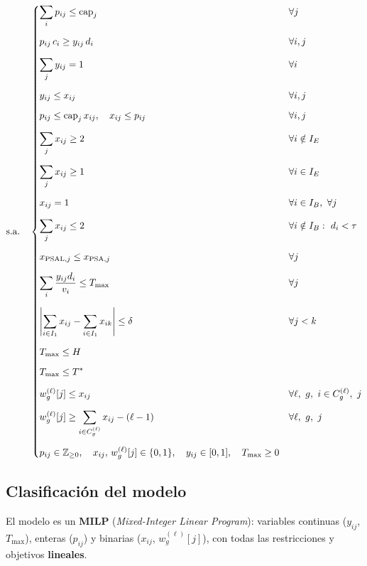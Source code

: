 \documentclass[12pt, a4paper]{article}
\begin{document}
\[
\text{s.a.} \quad
\begin{dcases}
\displaystyle\sum_{i} p_{ij} \leq \text{cap}_j & \forall j \\[6pt]
p_{ij}\, c_i \geq y_{ij}\, d_i & \forall i,j \\[6pt]
\displaystyle\sum_{j} y_{ij} = 1 & \forall i \\[6pt]
y_{ij} \leq x_{ij} & \forall i,j \\[6pt]
p_{ij} \leq \text{cap}_j\, x_{ij},\quad x_{ij} \leq p_{ij} & \forall i,j \\[6pt]
\displaystyle\sum_{j} x_{ij} \geq 2 & \forall i \notin I_E \\[6pt]
\displaystyle\sum_{j} x_{ij} \geq 1 & \forall i \in I_E \\[6pt]
x_{ij} = 1 & \forall i \in I_B,\ \forall j \\[6pt]
\displaystyle\sum_{j} x_{ij} \leq 2 & \forall i \notin I_B :\ d_i < \tau \\[6pt]
x_{\text{PSAL},j} \leq x_{\text{PSA},j} & \forall j \\[6pt]
\displaystyle\sum_{i} \dfrac{y_{ij} d_i}{v_i} \leq T_{\max} & \forall j \\[6pt]
\left|\displaystyle\sum_{i \in I_1} x_{ij} - \sum_{i \in I_1} x_{ik}\right| \leq \delta & \forall j < k \\[6pt]
T_{\max} \leq H \\[6pt]
T_{\max} \leq T^* \\[6pt]
w_g^{(\ell)}[j] \leq x_{ij} & \forall \ell,\ g,\ i \in C_g^{(\ell)},\ j \\[6pt]
w_g^{(\ell)}[j] \geq \displaystyle\sum_{i \in C_g^{(\ell)}} x_{ij} - (\ell-1) & \forall \ell,\ g,\ j \\[6pt]
p_{ij} \in \mathbb{Z}_{\geq 0},\quad x_{ij},\,w_g^{(\ell)}[j] \in \{0,1\},\quad y_{ij} \in [0,1],\quad T_{\max} \geq 0
\end{dcases}
\]

\subsection{Clasificación del modelo}

El modelo es un \textbf{MILP} (\textit{Mixed-Integer Linear Program}): variables continuas
($y_{ij}$, $T_{\max}$), enteras ($p_{ij}$) y binarias ($x_{ij}$, $w_g^{(\ell)}[j]$),
con todas las restricciones y objetivos \textbf{lineales}.
\end{document}
